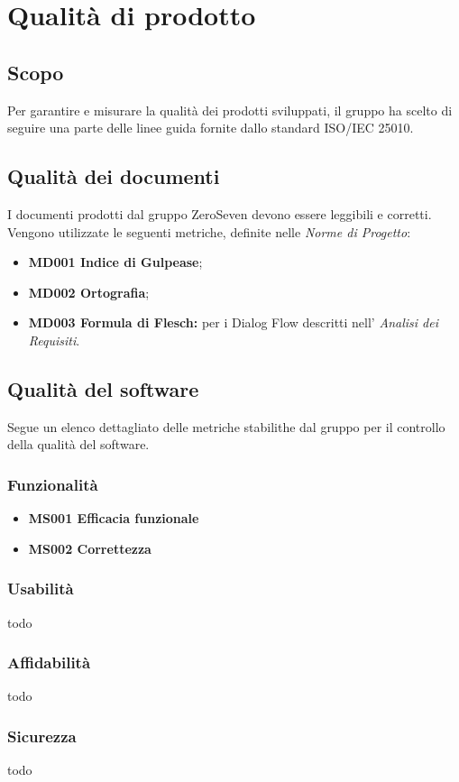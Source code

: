 \chapter{Qualità di prodotto}
\section{Scopo}
Per garantire e misurare la qualità dei prodotti sviluppati, il gruppo ha scelto di seguire una parte delle linee guida fornite dallo standard ISO/IEC 25010.
\section{Qualità dei documenti}
I documenti prodotti dal gruppo ZeroSeven devono essere leggibili e corretti. Vengono utilizzate le seguenti metriche, definite nelle \textit{Norme di Progetto}:
\begin{itemize}
    \item \textbf{MD001 Indice di Gulpease};
    \item \textbf{MD002 Ortografia};
    \item \textbf{MD003 Formula di Flesch:} per i Dialog Flow descritti nell' \textit{Analisi dei Requisiti}.
\end{itemize}
\section{Qualità del software}
Segue un elenco dettagliato delle metriche stabilithe dal gruppo per il controllo della qualità del software.

\subsection{Funzionalità}
\begin{itemize}
	\item \textbf{MS001 Efficacia funzionale}
	\item \textbf{MS002 Correttezza}
\end{itemize}
\subsection{Usabilità}
todo
\subsection{Affidabilità}
todo
\subsection{Sicurezza}
todo
